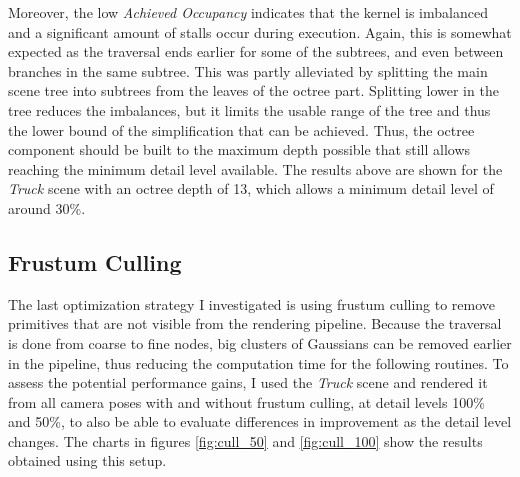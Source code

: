 Moreover, the low \textit{Achieved Occupancy} indicates that the kernel is imbalanced and a significant amount of stalls occur during execution. Again, this is somewhat expected as the traversal ends earlier for some of the subtrees, and even between branches in the same subtree. This was partly alleviated by splitting the main scene tree into subtrees from the leaves of the octree part. Splitting lower in the tree reduces the imbalances, but it limits the usable range of the tree and thus the lower bound of the simplification that can be achieved. Thus, the octree component should be built to the maximum depth possible that still allows reaching the minimum detail level available. The results above are shown for the \textit{Truck} scene with an octree depth of 13, which allows a minimum detail level of around 30\%.

\subsection{Frustum Culling}
The last optimization strategy I investigated is using frustum culling to remove primitives that are not visible from the rendering pipeline. Because the traversal is done from coarse to fine nodes, big clusters of Gaussians can be removed earlier in the pipeline, thus reducing the computation time for the following routines. To assess the potential performance gains, I used the \textit{Truck} scene and rendered it from all camera poses with and without frustum culling, at detail levels 100\% and 50\%, to also be able to evaluate differences in improvement as the detail level changes. The charts in figures \ref{fig:cull_50} and \ref{fig:cull_100} show the results obtained using this setup.

\begin{figure}[H]
\end{figure}

